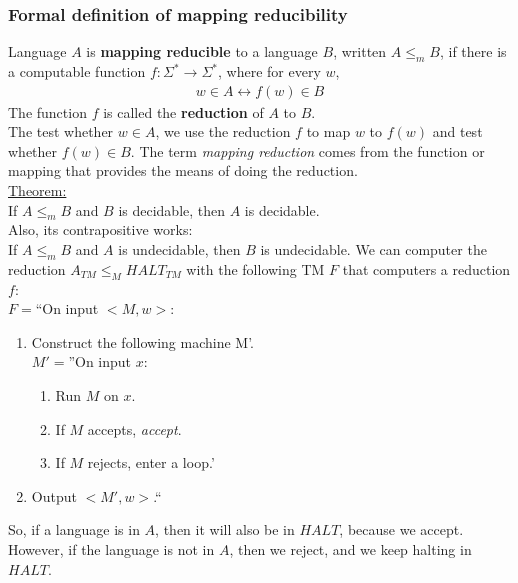 \documentclass[a4paper]{article}
\begin{document}
\subsubsection{Formal definition of mapping reducibility}
Language $A$ is {\bf mapping reducible} to a language $B$, written $A \leq_m B$, if there is a computable function $f:\Sigma^*\rightarrow\Sigma^*$, where for every $w$,
\begin{align}
  w\in A \leftrightarrow f(w)\in B
\end{align}
The function $f$ is called the {\bf reduction} of $A$ to $B$.\\
The test whether $w\in A$, we use the reduction $f$ to map $w$ to $f(w)$ and test whether $f(w)\in B$. The term \emph{mapping reduction} comes from the function or mapping that provides the means of doing the reduction.\\
\underline{Theorem:} \\
If $A \leq_m B$ and $B$ is decidable, then $A$ is decidable.\\
Also, its contrapositive works: \\
If $A\leq_mB$ and $A$ is undecidable, then $B$ is undecidable.
We can computer the reduction $A_{TM} \leq_M HALT_{TM}$ with the following TM $F$ that computers a reduction $f$:\\
$F=$``On input $<M,w>$:
\begin{enumerate}[{\bf 1.}]
  \item Construct the following machine M'. \\
    $M'=$''On input $x$:
    \begin{enumerate}
      \item Run $M$ on $x$.
      \item If $M$ accepts, \emph{accept}.
      \item If $M$ rejects, enter a loop.'
    \end{enumerate}
  \item Output $<M',w>$.``
\end{enumerate}
So, if a language is in $A$, then it will also be in $HALT$, because we accept. However, if the language is not in $A$, then we reject, and we keep halting in $HALT$.

\end{document}
